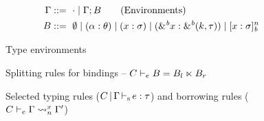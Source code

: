\begin{figure}[tp]
  \begin{align*}
    \E &::=\ \Eempty \mid \E;B\tag{Environments}\\
    B &::=\ \bnone %
    \mid \bvar{\tvar}{\kschm} %
    \mid \bvar{x}{\schm}%
    \mid \bvar{\borrow{x}}{\borrowty{k}{\tau}}%
    \mid \svar{x}{\schm}^n %
  \end{align*}
  \vspace{-10pt}
  \caption{Type environments}
  \label{grammar:env}
  \vspace{5pt}
  \centering
    
    \vspace{-5pt}
    \caption{Splitting rules for bindings -- $C \vdash_e B = B_l \ltimes B_r$}
    \label{sdtyp:split}
  \vspace{-10pt}
\end{figure}


\begin{figure*}[tp]
    \vspace{-10pt}
    \caption{Selected typing rules ($C \operatorname{|} \Gamma \operatorname{\vdash_s} e : \tau$)
      and borrowing rules ($C \vdash_e \Gamma \rightsquigarrow_{n}^{x} \Gamma'$)}
    \label{selectrules:borrow}
    \label{selectrules:binders}
    \label{sdtyp:app}
    \label{selectrules:region}
    \label{env:rule:borrow}
    \vspace{-5pt}
\end{figure*}

